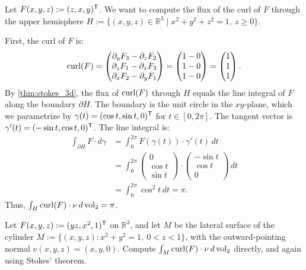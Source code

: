 \begin{example}
\label{ex:stokes_hemisphere_linear_field}
Let $F(x,y,z) := (z, x, y)^{\mathsf{T}}$. We want to compute the flux of the curl of $F$ through the upper hemisphere $H := \{(x,y,z) \in \mathbb{R}^3 \mid x^2 + y^2 + z^2 = 1,\ z \geq 0\}$.

First, the curl of $F$ is:
\[\operatorname{curl}(F) = \begin{pmatrix} \partial_y F_3 - \partial_z F_2 \\ \partial_z F_1 - \partial_x F_3 \\ \partial_x F_2 - \partial_y F_1 \end{pmatrix} = \begin{pmatrix} 1 - 0 \\ 1 - 0 \\ 1 - 0 \end{pmatrix} = \begin{pmatrix} 1 \\ 1 \\ 1 \end{pmatrix}.\]
By \cref{thm:stokes_3d}, the flux of $\operatorname{curl}(F)$ through $H$ equals the line integral of $F$ along the boundary $\partial H$. The boundary is the unit circle in the $xy$-plane, which we parametrize by $\gamma(t) = (\cos t, \sin t, 0)^{\mathsf{T}}$ for $t \in [0, 2\pi]$. The tangent vector is $\gamma'(t) = (-\sin t, \cos t, 0)^{\mathsf{T}}$.
The line integral is:
\begin{align*}
\int_{\partial H} F \cdot d\gamma &= \int_0^{2\pi} F(\gamma(t)) \cdot \gamma'(t) \,dt \\
&= \int_0^{2\pi} \begin{pmatrix} 0 \\ \cos t \\ \sin t \end{pmatrix} \cdot \begin{pmatrix} -\sin t \\ \cos t \\ 0 \end{pmatrix} \,dt \\
&= \int_0^{2\pi} \cos^2 t \,dt = \pi.
\end{align*}
Thus, $\int_H \operatorname{curl}(F) \cdot \nu \,d\operatorname{vol}_2 = \pi$.
\end{example}

\begin{exercise}
\label{ex:cylinder_flux_direct_and_stokes}
Let $F(x,y,z) := (yz,x^2,1)^{\mathsf{T}}$ on $\mathbb{R}^3$, and let $M$ be the lateral surface of the
cylinder $M := \{(x,y,z) : x^2+y^2=1,\ 0<z<1\}$, with the outward-pointing normal
$\nu(x,y,z)=(x,y,0)$. Compute $\int_M\operatorname{curl}(F)\cdot\nu\,d\operatorname{vol}_2$ directly, and again using
Stokes' theorem.
\end{exercise}

